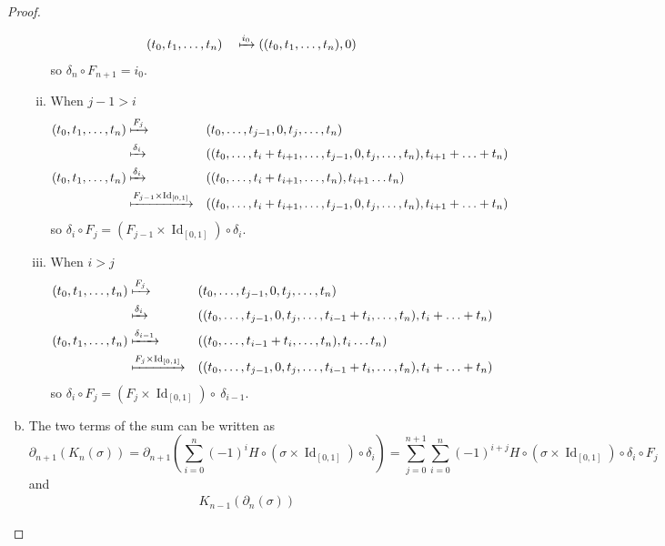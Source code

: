 \documentclass{article}
\newcommand{\id}[1]{\operatorname{Id}_{#1}}
\begin{document}
\begin{proof}
\begin{enumerate}[a.]
\begin{enumerate}[(i)]
\begin{alignat*}{2}
        (t_0, t_1, \hdots, t_n) &
        &&\xmapsto{i_0} ((t_0, t_1, \hdots, t_n), 0)
      \end{alignat*}
      so $\delta_n \circ F_{n+1} = i_0$.
      \item
      When $j - 1 > i$ \begin{alignat*}{2}
        (t_0, t_1, \hdots, t_n)
        &\xmapsto{F_j} &&(t_0, \hdots, t_{j-1}, 0, t_j, \hdots, t_n) \\
        &\xmapsto{\delta_i} && (
          (t_0, \hdots, t_i + t_{i + 1}, \hdots, t_{j-1}, 0, t_j, \hdots, t_n),
          t_{i+1} + \hdots + t_n
        ) \\
        (t_0, t_1, \hdots, t_n)
        &\xmapsto{\delta_i} &&
        ((t_0, \hdots, t_i + t_{i + 1}, \hdots, t_n), t_{i + 1} \hdots t_n)\\
        &\xmapsto{F_{j-1} \times \id{[0,1]}} &&(
          (t_0, \hdots, t_i + t_{i + 1}, \hdots, t_{j-1}, 0, t_j, \hdots, t_n),
          t_{i+1} + \hdots + t_n
        )
      \end{alignat*}
      so $\delta_i \circ F_j = (F_{j-1} \times \id{[0,1]}) \circ \delta_i$.
      \item
      When $i > j$ \begin{alignat*}{2}
        (t_0, t_1, \hdots, t_n)
        &\xmapsto{F_j} &&(t_0, \hdots, t_{j-1}, 0, t_j, \hdots, t_n) \\
        &\xmapsto{\delta_i} && (
          (t_0, \hdots, t_{j-1}, 0, t_j, \hdots, t_{i-1} + t_i, \hdots, t_n),
          t_i + \hdots + t_n
        ) \\
        (t_0, t_1, \hdots, t_n)
        &\xmapsto{\delta_{i-1}} &&
        ((t_0, \hdots, t_{i-1} + t_i, \hdots, t_n), t_i \hdots t_n)\\
        &\xmapsto{F_j \times \id{[0,1]}} &&(
          (t_0, \hdots, t_{j-1}, 0, t_j, \hdots, t_{i-1} + t_i, \hdots, t_n),
          t_i + \hdots + t_n
        )
      \end{alignat*}
      so $\delta_i \circ F_j = (F_j \times \id{[0,1]}) \circ ~ \delta_{i-1}$.
    \end{enumerate}
    \item The two terms of the sum can be written as \[
      \partial_{n+1}(K_n(\sigma))
      = \partial_{n+1} \left(\sum_{i=0}^{n} (-1)^{i} H\circ(\sigma \times \id{[0,1]}) \circ \delta_i\right)
      = \sum_{j=0}^{n+1}\sum_{i=0}^{n} (-1)^{i + j} H\circ(\sigma \times \id{[0,1]}) \circ \delta_i \circ F_j
    \] and \begin{align*}
      K_{n-1}(\partial_{n}(\sigma))

\end{align*}
\end{enumerate}
\end{proof}
\end{document}
